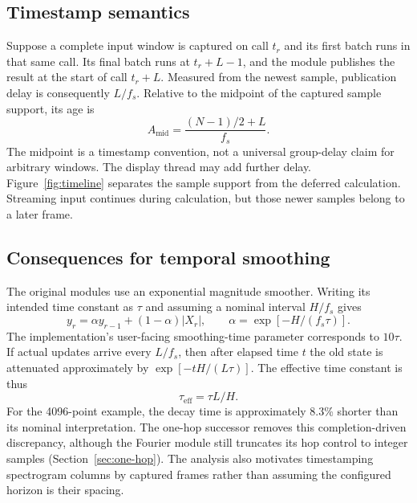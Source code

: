 \subsection{Timestamp semantics}
Suppose a complete input window is captured on call $t_r$ and its first batch
runs in that same call. Its final batch runs at $t_r+L-1$, and the module
publishes the result at the start of call $t_r+L$. Measured from the newest
sample, publication delay is consequently $L/f_s$. Relative to the midpoint
of the captured sample support, its age is
\begin{equation}
 A_{\mathrm{mid}}=\frac{(N-1)/2+L}{f_s}.
 \label{eq:age}
\end{equation}
The midpoint is a timestamp convention, not a universal group-delay claim for
arbitrary windows. The display thread may add further delay. Figure~\ref{fig:timeline}
separates the sample support from the deferred calculation. Streaming input
continues during calculation, but those newer samples belong to a later frame.



\subsection{Consequences for temporal smoothing}
The original modules use an exponential magnitude smoother. Writing its intended time
constant as $\tau$ and assuming a nominal interval $H/f_s$ gives
\begin{equation}
 y_r=\alpha y_{r-1}+(1-\alpha)|X_r|,\qquad
 \alpha=\exp[-H/(f_s\tau)].
\end{equation}
The implementation's user-facing smoothing-time parameter corresponds to
$10\tau$. If actual updates arrive every $L/f_s$, then after elapsed time $t$
the old state is attenuated approximately by
$\exp[-tH/(L\tau)]$. The effective time constant is thus
\begin{equation}
 \tau_{\mathrm{eff}}=\tau L/H.
\end{equation}
For the 4096-point example, the decay time is approximately 8.3\% shorter than
its nominal interpretation. The one-hop successor removes this
completion-driven discrepancy, although the Fourier module still truncates its
hop control to integer samples (Section~\ref{sec:one-hop}). The analysis also
motivates timestamping
spectrogram columns by captured frames rather than assuming the configured
horizon is their spacing.

